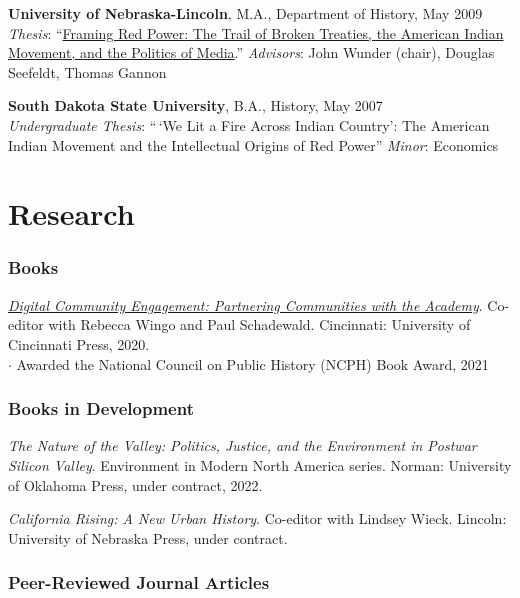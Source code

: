 \textbf{University of Nebraska-Lincoln}, M.A., Department of History,
May 2009\\
\emph{Thesis}:
``\href{http://digitalcommons.unl.edu/historydiss/21/}{Framing Red
Power: The Trail of Broken Treaties, the American Indian Movement, and
the Politics of Media}.'' \emph{Advisors}: John Wunder (chair), Douglas
Seefeldt, Thomas Gannon

\textbf{South Dakota State University}, B.A., History, May 2007\\
\emph{Undergraduate Thesis}: ``\,`We Lit a Fire Across Indian Country':
The American Indian Movement and the Intellectual Origins of Red Power''
\emph{Minor}: Economics

\hypertarget{research}{%
\section{Research}\label{research}}

\hypertarget{books}{%
\subsubsection{Books}\label{books}}

\emph{\href{https://ucincinnatipress.manifoldapp.org/projects/digital-community-engagement}{Digital
Community Engagement: Partnering Communities with the Academy}}.
Co-editor with Rebecca Wingo and Paul Schadewald. Cincinnati: University
of Cincinnati Press, 2020.\\
\quad \(\cdot\) Awarded the National Council on Public History (NCPH)
Book Award, 2021

\hypertarget{books-in-development}{%
\subsubsection{Books in Development}\label{books-in-development}}

\emph{The Nature of the Valley: Politics, Justice, and the Environment
in Postwar Silicon Valley}. Environment in Modern North America series.
Norman: University of Oklahoma Press, under contract, 2022.

\emph{California Rising: A New Urban History}. Co-editor with Lindsey
Wieck. Lincoln: University of Nebraska Press, under contract.

\hypertarget{peer-reviewed-journal-articles}{%
\subsubsection{Peer-Reviewed Journal
Articles}\label{peer-reviewed-journal-articles}}

